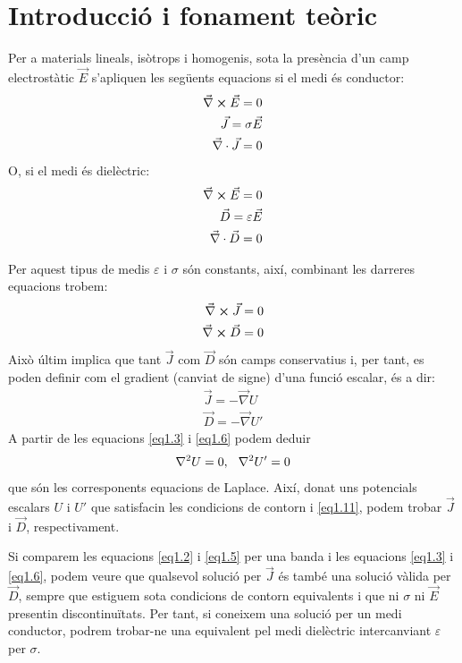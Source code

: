 \documentclass[a4paper,10.5pt]{report}
\begin{document}
	\section{Introducció i fonament teòric}
	Per a materials lineals, isòtrops i homogenis, sota la presència d'un camp electrostàtic $\vec{E}$ s'apliquen les següents equacions si el medi és conductor:
	\begin{align}
		\vec{\nabla} \cross \vec{E} = 0 \\
		\vec{J} = \sigma \vec{E} \label{eq1.2}  \\ 
		\vec{\nabla}\cdot \vec{J} = 0 \label{eq1.3}
	\end{align}
	O, si el medi és dielèctric:
	\begin{align}
		\vec{\nabla} \cross \vec{E} = 0 \\
		\vec{D} = \varepsilon \vec{E} \label{eq1.5} \\ 
		\vec{\nabla}\cdot \vec{D} = 0 \label{eq1.6}
	\end{align}

	Per aquest tipus de medis $\varepsilon$ i $\sigma$ són constants, així, combinant les darreres equacions trobem:
	\begin{align}
		\vec{\nabla} \cross \vec{J} = 0 \\
		\vec{\nabla} \cross \vec{D} = 0
	\end{align}
	Això últim implica que tant $\vec{J}$ com $\vec{D}$ són camps conservatius i, per tant, es poden definir com el gradient (canviat de signe) d'una funció escalar, és a dir:
	\begin{align}
		\vec{J} = -\vec{\nabla}{U} \\
		\vec{D} = -\vec{\nabla}{U'}
	\end{align}
	A partir de les equacions \eqref{eq1.3} i \eqref{eq1.6} podem deduir
	\begin{equation}
		\nabla^2 U  = 0, \hspace{0.25cm} \nabla^2 U' = 0 \label{eq1.11}
	\end{equation}
	que són les corresponents equacions de Laplace. Així, donat uns potencials escalars $U$ i $U'$ que satisfacin les condicions de contorn i \eqref{eq1.11}, podem trobar $\vec{J}$ i $\vec{D}$, respectivament.
	
	Si comparem les equacions \eqref{eq1.2} i \eqref{eq1.5} per una banda i les equacions \eqref{eq1.3} i \eqref{eq1.6}, podem veure que qualsevol solució per $\vec{J}$ és també una solució vàlida per $\vec{D}$, sempre que estiguem sota condicions de contorn equivalents i que ni $\sigma$ ni $\vec{E}$ presentin discontinuïtats. Per tant, si coneixem una solució per un medi conductor, podrem trobar-ne una equivalent pel medi dielèctric intercanviant $\varepsilon$ per $\sigma$.
	
\end{document}

